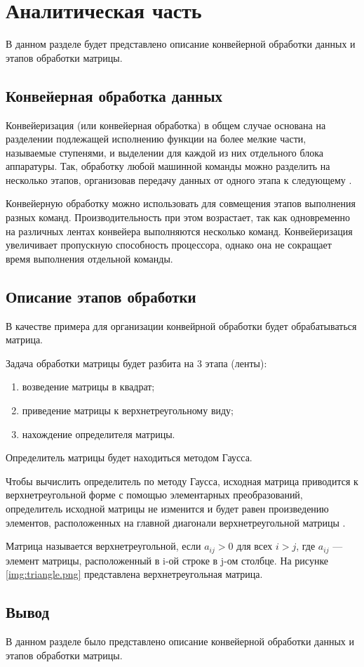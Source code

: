 \chapter{Аналитическая часть}
В данном разделе будет представлено описание конвейерной обработки данных и этапов обработки матрицы.

\section{Конвейерная обработка данных}
Конвейеризация (или конвейерная обработка) в общем случае основана на разделении подлежащей исполнению функции на более мелкие части, называемые ступенями, и выделении для каждой из них отдельного блока аппаратуры. Так, обработку любой машинной команды можно разделить на несколько этапов, организовав передачу данных от одного этапа к следующему \cite{conveyor}.

Конвейерную обработку можно использовать для совмещения этапов выполнения разных команд. Производительность при этом возрастает, так как одновременно на различных лентах конвейера выполняются несколько команд.
Конвейеризация увеличивает пропускную способность процессора, однако она не сокращает время выполнения отдельной команды.

\section{Описание этапов обработки}
В качестве примера для организации конвейрной обработки будет обрабатываться матрица.

Задача обработки матрицы будет разбита на 3 этапа (ленты):
\begin{enumerate}[label={\arabic*)}]
	\item возведение матрицы в квадрат;
	\item приведение матрицы к верхнетреугольному виду;
        \item нахождение определителя матрицы.
\end{enumerate}
Определитель матрицы будет находиться методом Гаусса.

Чтобы вычислить определитель по методу Гаусса, исходная матрица приводится к верхнетреугольной форме с помощью элементарных преобразований, определитель исходной матрицы не изменится и будет равен произведению элементов, расположенных на главной диагонали верхнетреугольной матрицы \cite{gauss}.

Матрица называется верхнетреугольной, если $a_{ij} > 0$ для всех $i>j$, где $a_{ij}$ --- элемент матрицы, расположенный в i-ой строке в j-ом столбце.
На рисунке \ref{img:triangle.png} представлена верхнетреугольная матрица.


\section*{Вывод}
В данном разделе было представлено описание конвейерной обработки данных и этапов обработки матрицы.